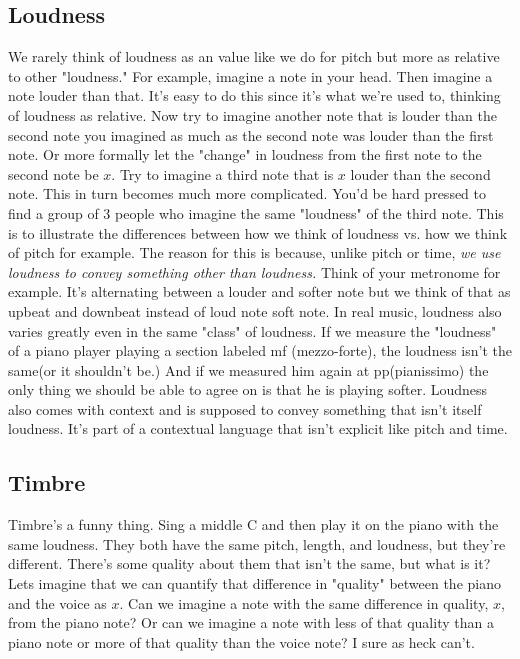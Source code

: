 \documentclass{article}
\begin{document}
\subsection{Loudness}
We rarely think of loudness as an value like we do for pitch but more as relative to other "loudness." For example, imagine a note in your head. Then imagine a note louder than that. It's easy to do this since it's what we're used to, thinking of loudness as relative. Now try to imagine another note that is louder than the second note you imagined as much as the second note was louder than the first note. Or more formally let the "change" in loudness from the first note to the second note be $x$. Try to imagine a third note that is $x$ louder than the second note. This in turn becomes much more complicated. You'd be hard pressed to find a group of 3 people who imagine the same "loudness" of the third note. This is to illustrate the differences between how we think of loudness vs. how we think of pitch for example. The reason for this is because, unlike pitch or time, \textit{we use loudness to convey something other than loudness.} Think of your metronome for example. It's alternating between a louder and softer note but we think of that as upbeat and downbeat instead of loud note soft note. In real music, loudness also varies greatly even in the same "class" of loudness. If we measure the "loudness" of a piano player playing a section labeled mf (mezzo-forte), the loudness isn't the same(or it shouldn't be.) And if we measured him again at pp(pianissimo) the only thing we should be able to agree on is that he is playing softer. Loudness also comes with context and is supposed to convey something that isn't itself loudness. It's part of a contextual language that isn't explicit like pitch and time. 
\subsection{Timbre}
Timbre's a funny thing. Sing a middle C and then play it on the piano with the same loudness. They both have the same pitch, length, and loudness, but they're different. There's some quality about them that isn't the same, but what is it? Lets imagine that we can quantify that difference in "quality" between the piano and the voice as $x$. Can we imagine a note with the same difference in quality, $x$, from the piano note? Or can we imagine a note with less of that quality than a piano note or more of that quality than the voice note? I sure as heck can't.
\end{document}
